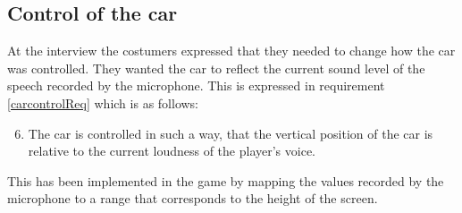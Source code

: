 \subsection{Control of the car}
At the interview the costumers expressed that they needed to change how the car was controlled.
They wanted the car to reflect the current sound level of the speech recorded by the microphone.
This is expressed in requirement \ref{carcontrolReq} which is as follows:
\begin{enumerate}
\setcounter{enumi}{5}
\item The car is controlled in such a way, that the vertical position of the car is relative to the current loudness of the player's voice.
\end{enumerate}

This has been implemented in the game by mapping the values recorded by the microphone to a range that corresponds to the height of the screen.

